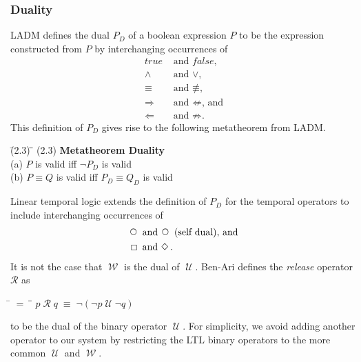 \documentclass[12pt, fleqn, leqno]{article}
\newcommand{\mymathindent}{24pt}                    %
\newcommand{\equivs}{\ensuremath{\;\equiv\;}}       %
\newcommand{\mynequiv}{\ensuremath{\not\equiv}}     %
\newcommand{\impl}{\ensuremath{\Rightarrow}}        %
\newcommand{\nimpl}{\ensuremath{\not\Rightarrow}}   %
\newcommand{\foll}{\ensuremath{\Leftarrow}}         %
\newcommand{\nfoll}{\ensuremath{\not\Leftarrow}}    %
\newcommand{\Until}{\;\mathcal{U}\;}
\newcommand{\Wait}{\;\mathcal{W}\;}
\newcommand{\Next}{\;\,\text{\raisebox{3.5pt}{\circle{6}}}}
\newcommand{\Event}{\Diamond\,}
\newcommand{\Always}{\Box\,}
\newcommand{\myqedtab}{\hspace{384pt}}              %
\begin{document}
\subsubsection{Duality}\label{section-duality}

LADM \cite{LADM} defines the dual $P_D$ of a boolean expression $P$ to be the expression constructed from $P$ by interchanging occurrences of
\begin{align*}
\mathit{true} &\textrm{ and } \mathit{false}\textrm{,}\\
\land         &\textrm{ and } \lor\textrm{,}\\
\equiv        &\textrm{ and } \mynequiv\textrm{,}\\
\impl         &\textrm{ and } \nfoll\textrm{, and}\\
\foll         &\textrm{ and } \nimpl\textrm{.}
\end{align*}
This definition of $P_D$ gives rise to the following metatheorem from LADM.
\begin{tabbing}
\hspace{\mymathindent} \= (2.3)\; \= \myqedtab \= \kill
  \> (2.3) \> \textbf{Metatheorem Duality}\\
  \>       \> (a) $P$ is valid iff $\neg P_D$ is valid\\
  \>       \> (b) $P \equiv Q$ is valid iff $P_D \equiv Q_D$ is valid
\end{tabbing}

Linear temporal logic extends the definition of $P_D$ for the temporal operators to include interchanging occurrences of
\begin{align*}
\Next      &\textrm{ and } \Next\textrm{ (self dual), and}\\
\Always    &\textrm{ and } \Event\textrm{.}
\end{align*}
It is not the case that $\Wait$ is the dual of $\Until$.
Ben-Ari \cite{Ben} defines the \textit{release} operator $\mathcal{R}$ as
\begin{tabbing}
\hspace{\mymathindent} \= $= \;$ \= \myqedtab \= \kill
  \> $p\;\mathcal{R}\; q\equivs \neg(\neg p \Until \neg q)$
\end{tabbing}
to be the dual of the binary operator $\Until$.
For simplicity, we avoid adding another operator to our system by restricting the LTL binary operators to the more common $\Until$ and $\Wait$.
\end{document}

